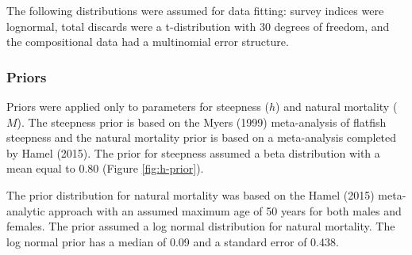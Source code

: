 \documentclass[11pt,
  english,
  a4paper,
]{article}
\begin{document}
\leavevmode\tagmcend\tagstructend\par


The following distributions were assumed for data fitting: survey indices were lognormal, total discards were a t-distribution with 30 degrees of freedom, and the compositional data had a multinomial error structure.

\leavevmode\tagmcend\tagstructend\par


\hypertarget{priors}{%
\subsubsection{Priors}\label{priors}}

\leavevmode\tagmcend\tagstructend


Priors were applied only to parameters for steepness ({\(h\)\leavevmode\tagmcend\tagstructend}) and natural mortality ({\(M\)\leavevmode\tagmcend\tagstructend}). The steepness prior is based on the Myers {(1999)\leavevmode\tagmcend\tagstructend} meta-analysis of flatfish steepness and the natural mortality prior is based on a meta-analysis completed by Hamel {(2015)\leavevmode\tagmcend\tagstructend}. The prior for steepness assumed a beta distribution with a mean equal to 0.80 (Figure \ref{fig:h-prior}).

\leavevmode\tagmcend\tagstructend\par


The prior distribution for natural mortality was based on the Hamel {(2015)\leavevmode\tagmcend\tagstructend} meta-analytic approach with an assumed maximum age of 50 years for both males and females. The prior assumed a log normal distribution for natural mortality. The log normal prior has a median of 0.09 and a standard error of 0.438.

\leavevmode\tagmcend\tagstructend\par
\end{document}
